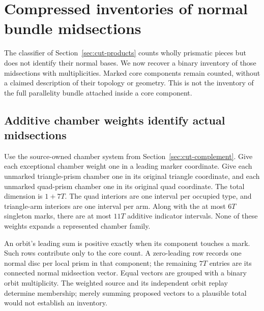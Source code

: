 \section{Compressed inventories of normal bundle midsections}
\label{sec:prismatic-inventory}

The classifier of Section~\ref{sec:cut-products} counts wholly prismatic
pieces but does not identify their normal bases. We now recover a binary
inventory of those midsections with multiplicities. Marked core components
remain counted, without a claimed description of their topology or geometry.
This is not the inventory of the full parallelity bundle attached inside
a core component.

\subsection{Additive chamber weights identify actual midsections}

Use the source-owned chamber system from Section~\ref{sec:cut-complement}.
Give each exceptional chamber weight one in a leading marker coordinate.
Give each unmarked triangle-prism chamber one in its original triangle
coordinate, and each unmarked quad-prism chamber one in its original quad
coordinate. The total dimension is $1+7T$. The quad interiors are one
interval per occupied type, and triangle-arm interiors are one interval
per arm. Along with the at most $6T$ singleton marks, there are at most
$11T$ additive indicator intervals. None of these weights expands a
represented chamber family.

An orbit's leading sum is positive exactly when its component touches a
mark. Such rows contribute only to the core count. A zero-leading row
records one normal disc per local prism in that component; the remaining
$7T$ entries are its connected normal midsection vector. Equal vectors
are grouped with a binary orbit multiplicity. The weighted source and
its independent orbit replay determine membership; merely summing proposed
vectors to a plausible total would not establish an inventory.

